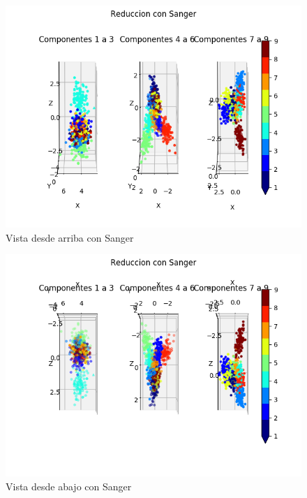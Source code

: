 \begin{figure}[H]
  \includegraphics[width=160mm]{imagenes/componentes_sanger_1.png}
  \caption{Vista desde arriba con Sanger}
\end{figure}

\begin{figure}[H]
  \includegraphics[width=160mm]{imagenes/componentes_sanger_2.png}
  \caption{Vista desde abajo con Sanger}
\end{figure}

